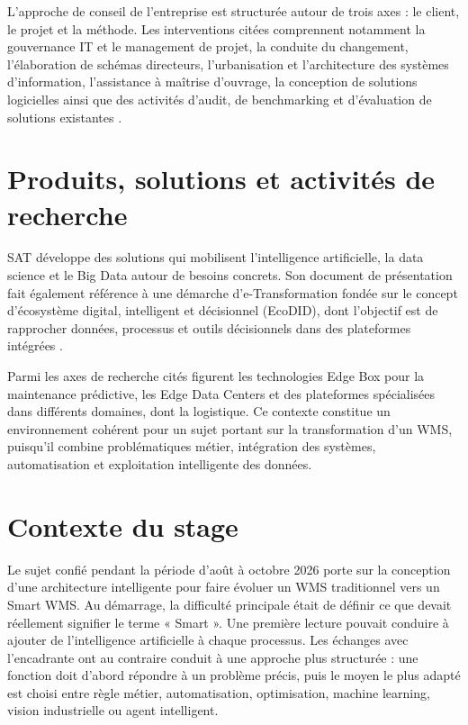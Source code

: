 L’approche de conseil de l’entreprise est structurée autour de trois axes : le client, le projet et la méthode. Les interventions citées comprennent notamment la gouvernance IT et le management de projet, la conduite du changement, l’élaboration de schémas directeurs, l’urbanisation et l’architecture des systèmes d’information, l’assistance à maîtrise d’ouvrage, la conception de solutions logicielles ainsi que des activités d’audit, de benchmarking et d’évaluation de solutions existantes \cite{ref1}.





\section{Produits, solutions et activités de recherche}

\label{sec:1.4}

SAT développe des solutions qui mobilisent l’intelligence artificielle, la data science et le Big Data autour de besoins concrets. Son document de présentation fait également référence à une démarche d’e-Transformation fondée sur le concept d’écosystème digital, intelligent et décisionnel (EcoDID), dont l’objectif est de rapprocher données, processus et outils décisionnels dans des plateformes intégrées \cite{ref1}.


Parmi les axes de recherche cités figurent les technologies Edge Box pour la maintenance prédictive, les Edge Data Centers et des plateformes spécialisées dans différents domaines, dont la logistique. Ce contexte constitue un environnement cohérent pour un sujet portant sur la transformation d’un WMS, puisqu’il combine problématiques métier, intégration des systèmes, automatisation et exploitation intelligente des données.



\section{Contexte du stage}

\label{sec:1.5}

Le sujet confié pendant la période d’août à octobre 2026 porte sur la conception d’une architecture intelligente pour faire évoluer un WMS traditionnel vers un Smart WMS. Au démarrage, la difficulté principale était de définir ce que devait réellement signifier le terme « Smart ». Une première lecture pouvait conduire à ajouter de l’intelligence artificielle à chaque processus. Les échanges avec l’encadrante ont au contraire conduit à une approche plus structurée : une fonction doit d’abord répondre à un problème précis, puis le moyen le plus adapté est choisi entre règle métier, automatisation, optimisation, machine learning, vision industrielle ou agent intelligent.


